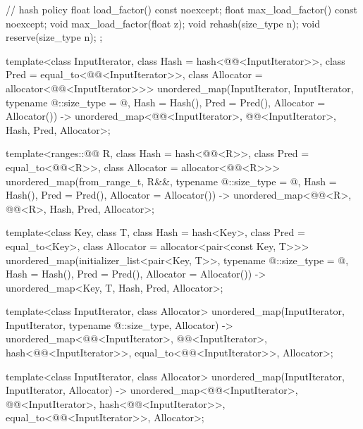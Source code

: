 \begin{codeblock}
{{    // hash policy
    float load_factor() const noexcept;
    float max_load_factor() const noexcept;
    void max_load_factor(float z);
    void rehash(size_type n);
    void reserve(size_type n);
  };

  template<class InputIterator,
           class Hash = hash<@@<InputIterator>>,
           class Pred = equal_to<@@<InputIterator>>,
           class Allocator = allocator<@@<InputIterator>>>
    unordered_map(InputIterator, InputIterator, typename @\seebelow@::size_type = @\seebelow@,
                  Hash = Hash(), Pred = Pred(), Allocator = Allocator())
      -> unordered_map<@@<InputIterator>, @@<InputIterator>, Hash, Pred,
                       Allocator>;

  template<ranges::@@ R, class Hash = hash<@@<R>>,
           class Pred = equal_to<@@<R>>,
           class Allocator = allocator<@@<R>>>
    unordered_map(from_range_t, R&&, typename @\seebelow@::size_type = @\seebelow@,
                  Hash = Hash(), Pred = Pred(), Allocator = Allocator())
      -> unordered_map<@@<R>, @@<R>, Hash, Pred, Allocator>;

  template<class Key, class T, class Hash = hash<Key>,
           class Pred = equal_to<Key>, class Allocator = allocator<pair<const Key, T>>>
    unordered_map(initializer_list<pair<Key, T>>,
                  typename @\seebelow@::size_type = @\seebelow@, Hash = Hash(),
                  Pred = Pred(), Allocator = Allocator())
      -> unordered_map<Key, T, Hash, Pred, Allocator>;

  template<class InputIterator, class Allocator>
    unordered_map(InputIterator, InputIterator, typename @\seebelow@::size_type, Allocator)
      -> unordered_map<@@<InputIterator>, @@<InputIterator>,
                       hash<@@<InputIterator>>,
                       equal_to<@@<InputIterator>>, Allocator>;

  template<class InputIterator, class Allocator>
    unordered_map(InputIterator, InputIterator, Allocator)
      -> unordered_map<@@<InputIterator>, @@<InputIterator>,
                       hash<@@<InputIterator>>,
                       equal_to<@@<InputIterator>>, Allocator>;

}
\end{codeblock}
